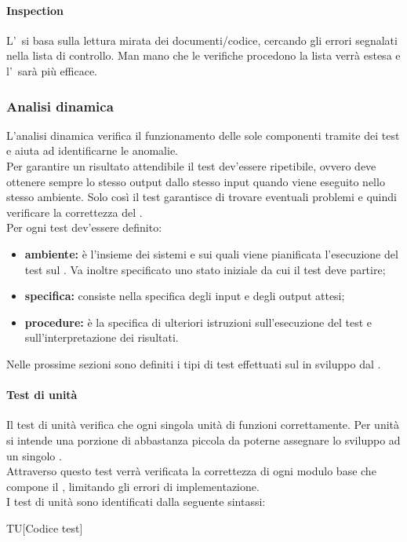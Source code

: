 			\paragraph{Inspection}
				L'\ si basa sulla lettura mirata dei documenti/codice, cercando gli errori segnalati nella lista di controllo. Man mano che le verifiche procedono la lista verrà estesa e l'\ sarà più efficace.
		\subsubsection{Analisi dinamica}
			L'analisi dinamica verifica il funzionamento delle sole componenti  tramite dei test e aiuta ad identificarne le anomalie. \\
			Per garantire un risultato attendibile il test dev'essere ripetibile, ovvero deve ottenere sempre lo stesso output dallo stesso input quando viene eseguito nello stesso ambiente. Solo così il test garantisce di trovare eventuali problemi e quindi verificare la correttezza del  . \\
			Per ogni test dev'essere definito:
			\begin{itemize}
				\item \textbf{ambiente:} è l'insieme dei sistemi  e  sui quali viene pianificata l'esecuzione del test sul . Va inoltre specificato uno stato iniziale da cui il test deve partire;
				\item \textbf{specifica:} consiste nella specifica degli input e degli output attesi;
				\item \textbf{procedure:} è la specifica di ulteriori istruzioni sull'esecuzione del test e sull'interpretazione dei risultati.
			\end{itemize}
			Nelle prossime sezioni sono definiti i tipi di test effettuati sul   in sviluppo dal .
			\paragraph{Test di unità}
				Il test di unità verifica che ogni singola unità di  funzioni correttamente. Per unità si intende una porzione di  abbastanza piccola da poterne assegnare lo sviluppo ad un singolo \PR. \\
				Attraverso questo test verrà verificata la correttezza di ogni modulo base che compone il , limitando gli errori di implementazione. \\
				I test di unità sono identificati dalla seguente sintassi:
				\begin{center}
					TU[Codice test]
				\end{center}
